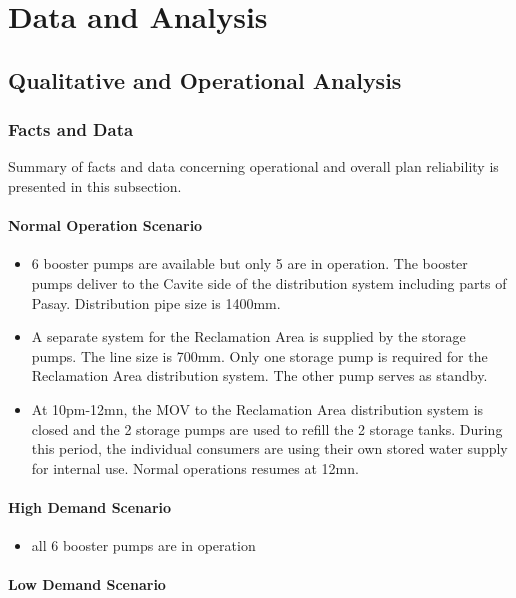 \chapter{Data and Analysis} \label{Chapter4}
\section{Qualitative and Operational Analysis}
\label{42}
\subsection{Facts and Data}
Summary of facts and data concerning operational and overall plan reliability is presented in this subsection.

\subsubsection{Normal Operation Scenario}
\begin{itemize}
\item 6 booster pumps are available but only 5 are in operation. The booster pumps deliver to the Cavite side of the distribution system including parts of Pasay. Distribution pipe size is 1400mm. 
\item A separate system for the Reclamation Area is supplied by the storage pumps. The line size is 700mm. Only one storage pump is required for the Reclamation Area distribution system. The other pump serves as standby. 
\item At 10pm-12mn, the MOV to the Reclamation Area distribution system is closed and the 2 storage pumps are used to refill the 2 storage tanks. During this period, the individual consumers are using their own stored water supply for internal use. Normal operations resumes at 12mn.



\end{itemize}

\subsubsection{High Demand Scenario}

\begin{itemize}
	\item all 6 booster pumps are in operation
\end{itemize}

\subsubsection{Low Demand Scenario}

